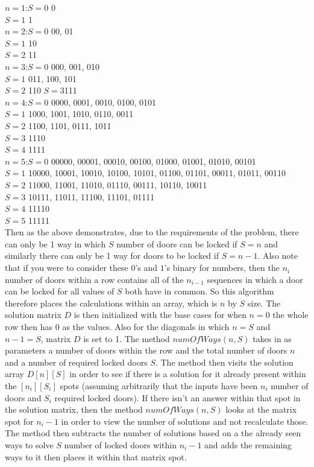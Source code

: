 \documentclass{article}
\begin{document}
$n=1$:$S=0$ {0}\\
	$S=1$ 	 {1}\\
$n=2$:$S=0$	{00, 01}\\
	$S=1$	{10}\\
	$S=2$	{11} \\
$n=3$:$S=0$	{000, 001, 010}\\
	$S=1$	{011, 100, 101}\\
	$S=2$	{110} 
	$S=3${111}\\
$n=4$:$S=0$	{0000, 0001, 0010, 0100, 0101}\\
	$S=1$	{1000, 1001, 1010, 0110, 0011}\\
	$S=2$	{1100, 1101, 0111, 1011}\\
	$S=3$	{1110}\\
	$S=4$	{1111}\\
$n=5$:$S=0$	{00000, 00001, 00010, 00100, 01000, 01001, 01010, 00101}\\
	$S=1$	{10000, 10001, 10010, 10100, 10101, 01100, 01101, 00011, 01011, 00110}\\
	$S=2$	{11000, 11001, 11010, 01110, 00111, 10110, 10011}\\
	$S=3$	{10111, 11011, 11100, 11101, 01111}\\
	$S=4$	{11110}\\
	$S=5$	{11111}\\
Then as the above demonstrates, due to the requirements of the problem, there can only be 1 way in which $S$ number of doors can be locked if $S=n$ and similarly there can only be 1 way for doors to be locked if $S=n-1$. Also note that if you were to consider these $0$'s and $1$'s binary for numbers, then the $n_i$ number of doors within a row contains all of the $n_{i-1}$ sequences in which a door can be locked for all values of $S$ both have in common. So this algorithm therefore places the calculations within an array, which is $n$ by $S$ size. The solution matrix $D$ is then initialized with the base cases for when $n=0$ the whole row then has $0$ as the values. Also for the diagonals in which $n=S$ and $n-1=S$, matrix $D$ is set to 1. The method $numOfWays(n, S)$ takes in as parameters a number of doors within the row and the total number of doors $n$ and a number of required locked doors $S$. The method then visits the solution array $D[n][S]$ in order to see if there is a solution for it already present within the $[n_i][S_i]$ spots (assuming arbitrarily that the inputs have been $n_i$ number of doors and $S_i$ required locked doors). If there isn't an answer within that spot in the solution matrix, then the method $numOfWays(n, S)$ looks at the matrix spot for $n_i - 1$ in order to view the number of solutions and not recalculate those. The method then subtracts the number of solutions based on a the already seen ways to solve $S$ number of locked doors within $n_i - 1$ and adds the remaining ways to it then places it within that matrix spot. \\
\end{document}

